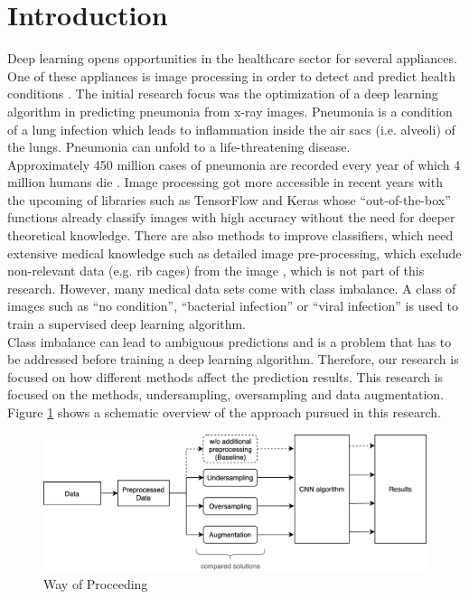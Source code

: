 \section* {Introduction}
Deep learning opens opportunities in the healthcare sector for several appliances. One of these appliances is image processing in order to detect and predict health conditions \cite{miotto2018deep}.  The initial research focus was the optimization of a deep learning algorithm in predicting pneumonia from x-ray images. Pneumonia is a condition of a lung infection which leads to inflammation inside the air sacs (i.e. alveoli) of the lungs. Pneumonia can unfold to a life-threatening disease.\\ Approximately 450 million cases of pneumonia are recorded every year of which 4 million humans die \cite{ruuskanen2011viral}. Image processing got more accessible in recent years with the upcoming of libraries such as TensorFlow and Keras whose “out-of-the-box” functions already classify images with high accuracy without the need for deeper theoretical knowledge. There are also methods to improve classifiers, which need extensive medical knowledge such as detailed image pre-processing, which exclude non-relevant data (e.g. rib cages) from the image \cite{kulkarnioptimization}, which is not part of this research. However, many medical data sets come with class imbalance. A class of images such as “no condition”, “bacterial infection” or “viral infection” is used to train a supervised deep learning algorithm. \\
Class imbalance can lead to ambiguous predictions and is a problem that has to be addressed before training a deep learning algorithm.  Therefore, our research is focused on how different methods affect the prediction results. This research is focused on the methods, undersampling, oversampling and data augmentation. Figure \ref{fig:plan} shows a schematic overview of the approach pursued in this research.
\begin{figure}[h]
  \centering
  \includegraphics[width=\linewidth]{figures/planOfAttack.png}
  \caption{Way of Proceeding}
  \label{fig:plan}
\end{figure}